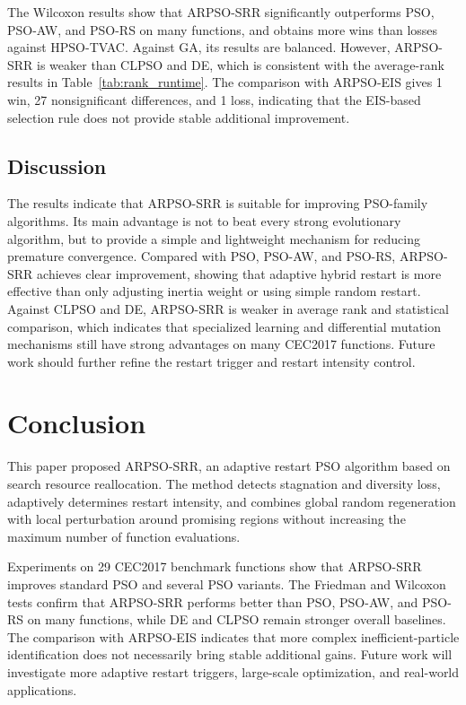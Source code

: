 \documentclass[conference]{IEEEtran}
\begin{document}
The Wilcoxon results show that ARPSO-SRR significantly outperforms PSO, PSO-AW, and PSO-RS on many functions, and obtains more wins than losses against HPSO-TVAC. Against GA, its results are balanced. However, ARPSO-SRR is weaker than CLPSO and DE, which is consistent with the average-rank results in Table~\ref{tab:rank_runtime}. The comparison with ARPSO-EIS gives 1 win, 27 nonsignificant differences, and 1 loss, indicating that the EIS-based selection rule does not provide stable additional improvement.


\subsection{Discussion}
The results indicate that ARPSO-SRR is suitable for improving PSO-family algorithms. Its main advantage is not to beat every strong evolutionary algorithm, but to provide a simple and lightweight mechanism for reducing premature convergence. Compared with PSO, PSO-AW, and PSO-RS, ARPSO-SRR achieves clear improvement, showing that adaptive hybrid restart is more effective than only adjusting inertia weight or using simple random restart. Against CLPSO and DE, ARPSO-SRR is weaker in average rank and statistical comparison, which indicates that specialized learning and differential mutation mechanisms still have strong advantages on many CEC2017 functions. Future work should further refine the restart trigger and restart intensity control.


\section{Conclusion}\label{sec:conclusion}
This paper proposed ARPSO-SRR, an adaptive restart PSO algorithm based on search resource reallocation. The method detects stagnation and diversity loss, adaptively determines restart intensity, and combines global random regeneration with local perturbation around promising regions without increasing the maximum number of function evaluations.

Experiments on 29 CEC2017 benchmark functions show that ARPSO-SRR improves standard PSO and several PSO variants. The Friedman and Wilcoxon tests confirm that ARPSO-SRR performs better than PSO, PSO-AW, and PSO-RS on many functions, while DE and CLPSO remain stronger overall baselines. The comparison with ARPSO-EIS indicates that more complex inefficient-particle identification does not necessarily bring stable additional gains. Future work will investigate more adaptive restart triggers, large-scale optimization, and real-world applications.
\end{document}
